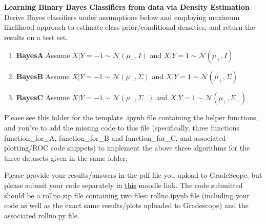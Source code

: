 \documentclass[solution,addpoints,12pt]{exam}
\begin{document}
\begin{questions}


\textbf{Learning Binary Bayes Classifiers from data via Density Estimation}\\
Derive Bayes classifiers under assumptions below and employing maximum likelihood approach to estimate class prior/conditional densities, and return the results on a test set.
\begin{enumerate}
\item \textbf{BayesA} Assume $X|Y=-1 \sim \mathcal{N}(\mu_-, I)$ and  $X|Y=1 \sim \mathcal{N}(\mu_+, I)$ 
\item \textbf{BayesB} Assume $X|Y=-1 \sim \mathcal{N}(\mu_-, \Sigma)$ and $X|Y=1 \sim \mathcal{N}(\mu_+, \Sigma)$ 
\item \textbf{BayesC} Assume $X|Y=-1 \sim \mathcal{N}(\mu_-, \Sigma_-)$ and $X|Y=1 \sim \mathcal{N}(\mu_+, \Sigma_+)$ 
\end{enumerate}
Please see \href{https://drive.google.com/drive/folders/1Ciew2xqnwD8V7D2PuRWzf8tpXLSVE7eQ?usp=sharing}{this folder} for the template .ipynb file containing the helper functions, and you've to add the missing code to this file (specifically, three functions function\_for\_A, function\_for\_B and function\_for\_C, and associated plotting/ROC code snippets) to implement the above three algorithms for the three datasets given in the same folder. 

Please provide your results/answers in the pdf file you upload to GradeScope, but please submit your code separately in \href{https://courses.iitm.ac.in/mod/assign/view.php?id=75983}{this} moodle link. The code submitted should be a rollno.zip file containing two files: rollno.ipynb file (including your code as well as the exact same results/plots uploaded to Gradescope) and the associated rollno.py file.


\end{questions}
\end{document}
